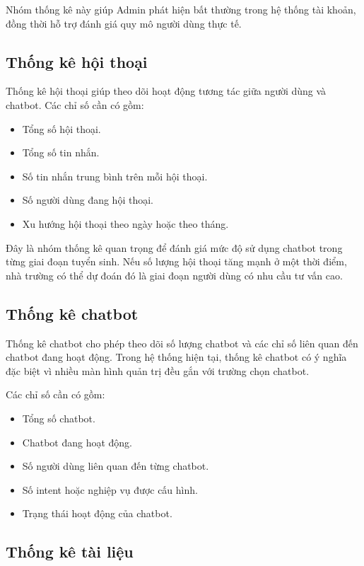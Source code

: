 Nhóm thống kê này giúp Admin phát hiện bất thường trong hệ thống tài khoản, đồng thời hỗ trợ đánh giá quy mô người dùng thực tế.

\subsection{Thống kê hội thoại}

Thống kê hội thoại giúp theo dõi hoạt động tương tác giữa người dùng và chatbot. Các chỉ số cần có gồm:

\begin{itemize}
    \item Tổng số hội thoại.
    \item Tổng số tin nhắn.
    \item Số tin nhắn trung bình trên mỗi hội thoại.
    \item Số người dùng đang hội thoại.
    \item Xu hướng hội thoại theo ngày hoặc theo tháng.
\end{itemize}

Đây là nhóm thống kê quan trọng để đánh giá mức độ sử dụng chatbot trong từng giai đoạn tuyển sinh. Nếu số lượng hội thoại tăng mạnh ở một thời điểm, nhà trường có thể dự đoán đó là giai đoạn người dùng có nhu cầu tư vấn cao.

\subsection{Thống kê chatbot}

Thống kê chatbot cho phép theo dõi số lượng chatbot và các chỉ số liên quan đến chatbot đang hoạt động. Trong hệ thống hiện tại, thống kê chatbot có ý nghĩa đặc biệt vì nhiều màn hình quản trị đều gắn với trường chọn chatbot.

Các chỉ số cần có gồm:

\begin{itemize}
    \item Tổng số chatbot.
    \item Chatbot đang hoạt động.
    \item Số người dùng liên quan đến từng chatbot.
    \item Số intent hoặc nghiệp vụ được cấu hình.
    \item Trạng thái hoạt động của chatbot.
\end{itemize}

\subsection{Thống kê tài liệu}

